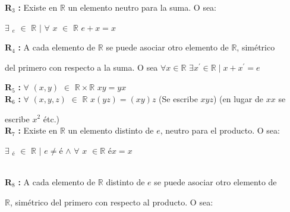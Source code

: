 \documentclass[12pt]{article}
\begin{document}
\textbf{R}$_3$ \hspace{0.1cm}\textbf{:} Existe en $\mathbb{R}$ un elemento neutro para la suma. O sea:\\
\begin{center}
    $\exists$ $_e$ $\in$ $\mathbb{R}$ $\mid$ $\forall$ $x$ $\in$ $\mathbb{R}$ \hspace{0.1 cm} $e+x = x$ 
\end{center}

\textbf{R}$_4$ \hspace{0.1cm}\textbf{:} A cada elemento de $\mathbb{R}$ se puede asociar otro elemento de $\mathbb{R}$, simétrico \par del primero con respecto a la suma. O sea $\forall x \in \mathbb{R}$ \hspace{0.1cm} $\exists x^{\prime} \in \mathbb{R} \mid x+x^{\prime} = e$ 

\newpage

\textbf{R}$_5$ \hspace{0.1cm}\textbf{:} $\forall$ $ ( x , y ) $ $\in$ $\mathbb{R} \times \mathbb{R}$ \hspace{0.1 cm} $xy = yx$ \\

\textbf{R}$_6$ \hspace{0.1cm}\textbf{:} $\forall$ $ ( x , y, z) $ $\in$ $\mathbb{R}$ \hspace{0.1 cm} $x(yz) = (xy)z$ \hspace{0.1 cm} (Se escribe $xyz$) (en lugar de $xx$ se \par escribe $x^{2}$ étc.) \\

\textbf{R}$_7$ \hspace{0.1cm}\textbf{:} Existe en $\mathbb{R}$ un elemento distinto de $e$, neutro para el producto. O sea:\\

\begin{center}
    $\exists$ $_é$ $\in$ $\mathbb{R}$ $\mid$ $e \neq é$ \hspace{0.1 cm} $\wedge$ \hspace{0.1 cm} $\forall$ $x$ $\in \mathbb{R}$ \hspace{0.1 cm} $éx = x$ 
\end{center}\\

\textbf{R}$_8$ \hspace{0.1cm}\textbf{:} A cada elemento de $\mathbb{R}$ distinto de $e$ se puede asociar otro elemento de \par $\mathbb{R}$, simétrico del primero con respecto al producto. O sea: \\
\end{document}
